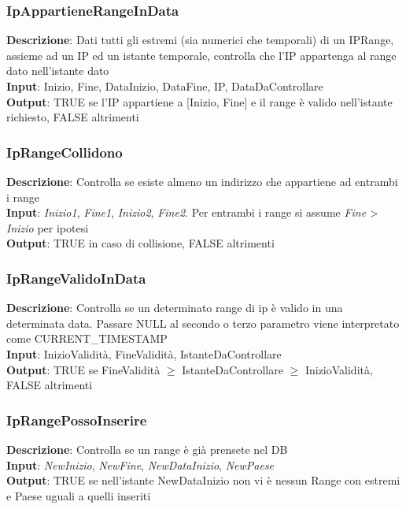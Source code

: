 \documentclass{article}
\begin{document}
\subsubsection{IpAppartieneRangeInData}
\textbf{Descrizione}: Dati tutti gli estremi (sia numerici che temporali) di un IPRange, assieme ad un IP ed un istante temporale, controlla che l'IP appartenga al range dato nell'istante dato\\
\textbf{Input}: Inizio, Fine, DataInizio, DataFine, IP, DataDaControllare \\
\textbf{Output}: TRUE se l'IP appartiene a [Inizio, Fine] e il range è valido nell'istante richiesto, FALSE altrimenti\\
\subsubsection{IpRangeCollidono}
\textbf{Descrizione}: Controlla se esiste almeno un indirizzo che appartiene ad entrambi i range\\
\textbf{Input}: \textit{Inizio1}, \textit{Fine1}, \textit{Inizio2}, \textit{Fine2}. Per entrambi i range si assume \textit{Fine} > \textit{Inizio} per ipotesi \\
\textbf{Output}: TRUE in caso di collisione, FALSE altrimenti \\
\subsubsection{IpRangeValidoInData}
\textbf{Descrizione}: Controlla se un determinato range di ip è valido in una determinata data. Passare NULL al secondo o terzo parametro viene interpretato come CURRENT\_TIMESTAMP\\
\textbf{Input}: InizioValidità, FineValidità, IstanteDaControllare \\
\textbf{Output}: TRUE se FineValidità $ \geq $ IstanteDaControllare $ \geq $  InizioValidità, FALSE altrimenti \\
\subsubsection{IpRangePossoInserire}
\textbf{Descrizione}: Controlla se un range è già prensete nel DB\\
\textbf{Input}: \textit{NewInizio}, \textit{NewFine}, \textit{NewDataInizio}, \textit{NewPaese} \\
\textbf{Output}: TRUE se nell'istante NewDataInizio non vi è nessun Range con estremi e Paese uguali a quelli inseriti \\
\end{document}
